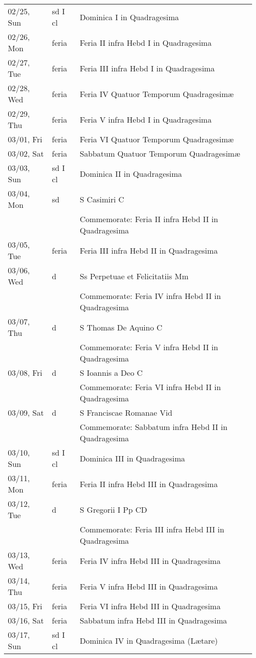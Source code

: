 \documentclass{article}
\begin{document}
\begin{longtable}{ l l l }
02/25, Sun & sd I cl & Dominica I in Quadragesima\\
02/26, Mon & feria & Feria II infra Hebd I in Quadragesima\\
02/27, Tue & feria & Feria III infra Hebd I in Quadragesima\\
02/28, Wed & feria & Feria IV Quatuor Temporum Quadragesimæ\\
02/29, Thu & feria & Feria V infra Hebd I in Quadragesima\\
03/01, Fri & feria & Feria VI Quatuor Temporum Quadragesimæ\\
03/02, Sat & feria & Sabbatum Quatuor Temporum Quadragesimæ\\
03/03, Sun & sd I cl & Dominica II in Quadragesima\\
03/04, Mon & sd & S Casimiri C\\
 & & Commemorate: Feria II infra Hebd II in Quadragesima\\
03/05, Tue & feria & Feria III infra Hebd II in Quadragesima\\
03/06, Wed & d & Ss Perpetuae et Felicitatiis Mm\\
 & & Commemorate: Feria IV infra Hebd II in Quadragesima\\
03/07, Thu & d & S Thomas De Aquino C\\
 & & Commemorate: Feria V infra Hebd II in Quadragesima\\
03/08, Fri & d & S Ioannis a Deo C\\
 & & Commemorate: Feria VI infra Hebd II in Quadragesima\\
03/09, Sat & d & S Franciscae Romanae Vid\\
 & & Commemorate: Sabbatum infra Hebd II in Quadragesima\\
03/10, Sun & sd I cl & Dominica III in Quadragesima\\
03/11, Mon & feria & Feria II infra Hebd III in Quadragesima\\
03/12, Tue & d & S Gregorii I Pp CD\\
 & & Commemorate: Feria III infra Hebd III in Quadragesima\\
03/13, Wed & feria & Feria IV infra Hebd III in Quadragesima\\
03/14, Thu & feria & Feria V infra Hebd III in Quadragesima\\
03/15, Fri & feria & Feria VI infra Hebd III in Quadragesima\\
03/16, Sat & feria & Sabbatum infra Hebd III in Quadragesima\\
03/17, Sun & sd I cl & Dominica IV in Quadragesima (Lætare)\\

\end{longtable}
\end{document}
